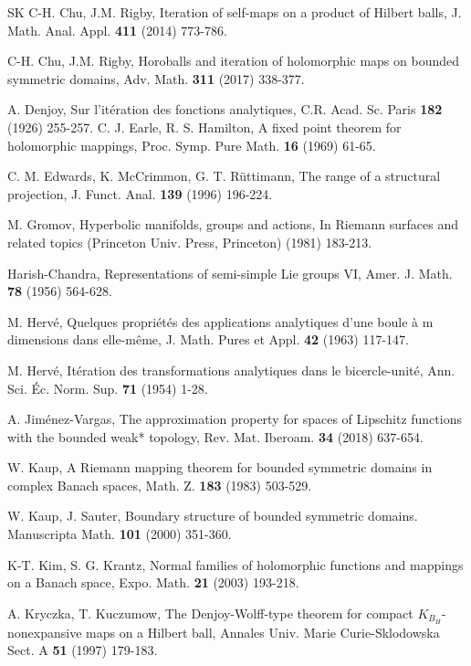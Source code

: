 \documentclass[12pt, twoside]{article}
\theoremstyle{definition}
\numberwithin{equation}{section}
\begin{document}
\begin{thebibliography}{SK}
 C-H. Chu,  J.M.  Rigby,   Iteration of self-maps on a product of
Hilbert balls,  J. Math. Anal. Appl. \textbf{411}  (2014) 773-786.

 C-H. Chu,  J.M. Rigby,    Horoballs and iteration of holomorphic maps on bounded
symmetric domains,  Adv. Math. \textbf{311}   (2017) 338-377.

  A. Denjoy,  Sur l'it\'eration des fonctions analytiques,
 C.R. Acad. Sc. Paris \textbf{182} (1926)
 255-257.
  C. J. Earle,  R. S. Hamilton,    A fixed point
theorem for holomorphic mappings,  Proc. Symp. Pure Math. \textbf{16} (1969) 61-65.

 C. M. Edwards,  K.  McCrimmon, G. T. R\"uttimann,    The range of a structural projection,
J. Funct. Anal. \textbf{139} (1996) 196-224.

 M. Gromov,   Hyperbolic manifolds, groups and actions, In Riemann surfaces
and related topics (Princeton Univ. Press, Princeton) (1981) 183-213.

 Harish-Chandra,   Representations of semi-simple
Lie groups VI,  Amer. J. Math. \textbf{78} (1956) 564-628.

 M. Herv\'e, Quelques propri\'et\'es des applications
analytiques d'une boule \`a m dimensions dans elle-m\^eme, J.
Math. Pures et Appl. \textbf{42} (1963) 117-147.

  M. Herv\'e,  It\'eration des transformations
analytiques dans le bicercle-unit\'e,  Ann. Sci. \'Ec. Norm. Sup.
\textbf{71} (1954) 1-28.

 A. Jim\'enez-Vargas,
The approximation property for spaces of Lipschitz functions
with the bounded weak* topology,
Rev. Mat. Iberoam. \textbf{34} (2018) 637-654.

 W. Kaup,    A Riemann mapping theorem for bounded
symmetric domains in complex Banach spaces,  Math. Z. {\bf
183} (1983) 503-529.

W. Kaup, J. Sauter,    Boundary structure of bounded
symmetric domains.  Manuscripta Math. \textbf{101}  (2000) 351-360.

K-T. Kim, S. G.  Krantz,   Normal families of
holomorphic functions and mappings on a Banach space, Expo. Math.
\textbf{21} (2003) 193-218.

 A. Kryczka, T. Kuczumow,   The Denjoy-Wolff-type theorem
for compact $K_{B_H}$-nonexpansive maps on a Hilbert ball,
 Annales Univ. Marie Curie-Sklodowska Sect. A \textbf{51} (1997) 179-183.



\end{thebibliography}
\end{document}
